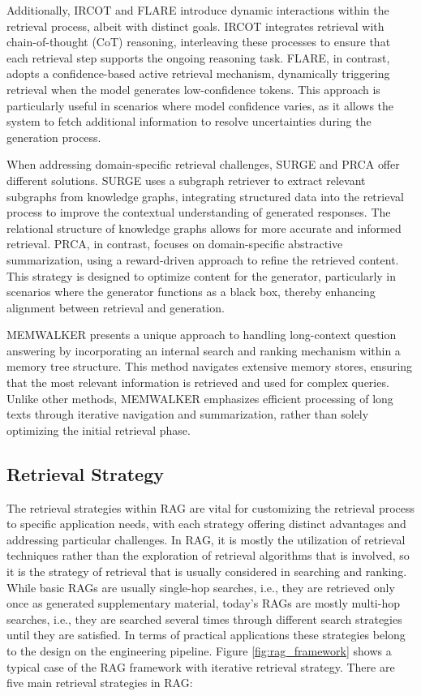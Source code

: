Additionally, IRCOT \cite{trivedi2023interleaving} and FLARE \cite{jiang2023active} introduce dynamic interactions within the retrieval process, albeit with distinct goals. IRCOT integrates retrieval with chain-of-thought (CoT) reasoning, interleaving these processes to ensure that each retrieval step supports the ongoing reasoning task. FLARE, in contrast, adopts a confidence-based active retrieval mechanism, dynamically triggering retrieval when the model generates low-confidence tokens. This approach is particularly useful in scenarios where model confidence varies, as it allows the system to fetch additional information to resolve uncertainties during the generation process.

When addressing domain-specific retrieval challenges, SURGE \cite{kang2023knowledge} and PRCA \cite{yang2023prca} offer different solutions. SURGE uses a subgraph retriever to extract relevant subgraphs from knowledge graphs, integrating structured data into the retrieval process to improve the contextual understanding of generated responses. The relational structure of knowledge graphs allows for more accurate and informed retrieval. PRCA, in contrast, focuses on domain-specific abstractive summarization, using a reward-driven approach to refine the retrieved content. This strategy is designed to optimize content for the generator, particularly in scenarios where the generator functions as a black box, thereby enhancing alignment between retrieval and generation.

MEMWALKER \cite{chen2023walking} presents a unique approach to handling long-context question answering by incorporating an internal search and ranking mechanism within a memory tree structure. This method navigates extensive memory stores, ensuring that the most relevant information is retrieved and used for complex queries. Unlike other methods, MEMWALKER emphasizes efficient processing of long texts through iterative navigation and summarization, rather than solely optimizing the initial retrieval phase.

\subsection{Retrieval Strategy}
The retrieval strategies within RAG are vital for customizing the retrieval process to specific application needs, with each strategy offering distinct advantages and addressing particular challenges. In RAG, it is mostly the utilization of retrieval techniques rather than the exploration of retrieval algorithms that is involved, so it is the strategy of retrieval that is usually considered in searching and ranking. While basic RAGs are usually single-hop searches, i.e., they are retrieved only once as generated supplementary material, today's RAGs are mostly multi-hop searches, i.e., they are searched several times through different search strategies until they are satisfied. In terms of practical applications these strategies belong to the design on the engineering pipeline. Figure \ref{fig:rag_framework} shows a typical case of the RAG framework with iterative retrieval strategy. There are five main retrieval strategies in RAG:


